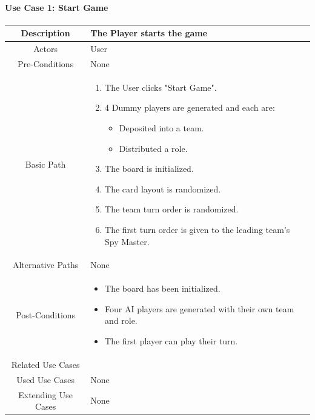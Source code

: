 \documentclass[10pt, a4paper]{article}
\begin{document}
			\paragraph{Use Case 1: Start Game }
			
			\begin{center}
				\begin{tabular}{ |c|p{10cm}| } 
					\hline
					Description & The Player starts the game  \\
					\hline 
					Actors & User \\
					\hline  
					Pre-Conditions & None \\
					\hline  
					Basic Path & 
						\begin{enumerate}
							\item The User clicks "Start Game".
							\item 4 Dummy players are generated and each are:
								\begin{itemize}
									\item Deposited into a team.
									\item Distributed a role.
								\end{itemize}
							\item The board is initialized.
							\item The card layout is randomized.
							\item The team turn order is randomized.
							\item The first turn order is given to the leading team's Spy Master.
						\end{enumerate}\\
					\hline
					Alternative Paths & None \\
					\hline
					Post-Conditions & 
						\begin{itemize}[noitemsep,topsep=0pt]
							\item The board has been initialized.
							\item Four AI players are generated with their own team and role.
							\item The first player can play their turn.
						\end{itemize}\\
					\hline 
					Related Use Cases &\\
					\hline 
					Used Use Cases & None\\
					\hline 
					Extending Use Cases & None \\
					\hline 
				\end{tabular}
			\end{center}
		
\end{document}
